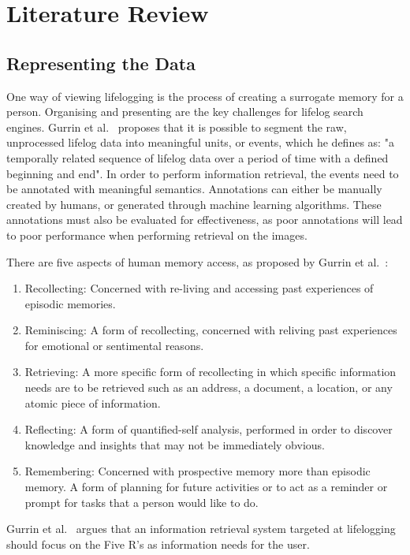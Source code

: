 \chapter{Literature Review}

\section{Representing the Data}
One way of viewing lifelogging is the process of creating a surrogate memory for a person. Organising and presenting are the key challenges for lifelog search engines. Gurrin et al.~\cite{gurrin2014lifelogging} proposes that it is possible to segment the raw, unprocessed lifelog data into meaningful units, or events, which he defines as: "a temporally related sequence of lifelog data over a period of time with a defined beginning and end". In order to perform information retrieval, the events need to be annotated with meaningful semantics. Annotations can either be manually created by humans, or generated through machine learning algorithms. These annotations must also be evaluated for effectiveness, as poor annotations will lead to poor performance when performing retrieval on the images.

There are five aspects of human memory access, as proposed by Gurrin et al.~\cite{gurrin2014lifelogging}:
\begin{enumerate}
    \item Recollecting: Concerned with re-living and accessing past experiences of episodic memories.
    \item Reminiscing: A form of recollecting, concerned with reliving past experiences for emotional or sentimental reasons.
    \item Retrieving: A more specific form of recollecting  in which specific information needs are to be retrieved such as an address, a document, a location, or any atomic piece of information.
    \item Reflecting: A form of quantified-self analysis, performed in order to discover knowledge and insights that may not be immediately obvious.
    \item Remembering: Concerned with prospective memory more than episodic memory. A form of planning for future activities or to act as a reminder or prompt for tasks that a person would like to do.
\end{enumerate}
Gurrin et al.~\cite{gurrin2014lifelogging} argues that an information retrieval system targeted at lifelogging should focus on the Five R's as information needs for the user.

